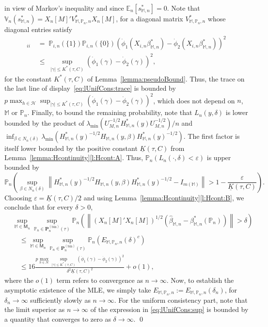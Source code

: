 \documentclass[preprint]{imsart}
\newcommand{\E}{{\mathbb E}}
\newcommand{\VC}{{\mathbb{V}}}
\renewcommand{\P}{{\mathbb P}}
\newcommand{\eps}{\varepsilon}
\newcommand{\M}{\mathbb M}
\newcommand{\lmin}{\lambda_{\min}}
\numberwithin{equation}{section}
\begin{document}
in view of Markov's inequality and since $\E_n[s_{\M,n}^*] = 0$. Note that $\VC_n(s_{\M,n}^*) = X_n[M]'V_{\M,\P_n,n}^*X_n[M]$, for a diagonal matrix $V_{\M,\P_n,n}^*$ whose diagonal entries satisfy 
\begin{align*}
[V_{\M,\P_n,n}^*]_{ii} \;&=\; \P_{i,n}(\{1\})\P_{i,n}(\{0\})(\dot{\phi}_1(X_{i,n}\beta_{\M,n}^*) - \dot{\phi}_2(X_{i,n}\beta_{\M,n}^*))^2 \\
\;&\le\; \sup_{|\gamma|\le K^*(\tau,C)}(\dot{\phi}_1(\gamma) - \dot{\phi}_2(\gamma))^2,
\end{align*}
for the constant $K^*(\tau,C)$ of Lemma~\ref{lemma:pseudoBound}.
Thus, the trace on the last line of display~\eqref{eq:lUnifCons:trace} is bounded by $p\max_{h\in\mathcal H}\sup_{|\gamma|\le K^*(\tau,C)}(\dot{\phi}_1(\gamma) - \dot{\phi}_2(\gamma))^2$, which does not depend on $n$, $\M$ or $\P_n$. Finally, to bound the remaining probability, note that $L_n(y,\delta)$ is lower bounded by the product of $\lmin(U_{M,n}^{-1/2}H_{\M,n}^*(y)U_{M,n}^{-1/2})/n$ and  $\inf_{\beta\in N_n(\delta)}  \lmin(H_{\M,n}^*(y)^{-1/2}H_{\M,n}(y,\beta)H_{\M,n}^*(y)^{-1/2})$. The first factor is itself lower bounded by the positive constant $\underline{K}(\tau, C)$ from Lemma~\ref{lemma:Hcontinuity}\ref{l:Hcont:A}. Thus, $\P_n(L_n(\cdot,\delta) < \eps )$ is upper bounded by
$$
\P_n\left( 
\sup_{\beta\in N_{n}(\delta)} \left\| H_{\M,n}^*(y)^{-1/2}H_{\M,n}(y,\beta)H_{\M,n}^*(y)^{-1/2} - I_{m(\M)} \right\| > 1- \frac{\eps}{\underline{K}(\tau, C)}
\right).
$$
Choosing $\eps = \underline{K}(\tau, C)/2$ and using Lemma~\ref{lemma:Hcontinuity}\ref{l:Hcont:B}, we conclude that for every $\delta>0$,
\begin{align}
&\sup_{\M\in\mathsf{M}_n}\sup_{\P_n\in\mathbf{P}_n^{(\mathrm{bin})}(\tau)} 
\P_n\left( 
	\left\| (X_n[M]'X_n[M])^{1/2}(\hat{\beta}_{\M,n} - \beta^*_{\M,n}(\P_n))\right\| > \delta\right)\label{eq:lUnifCons:sup}\\
&\quad\le	
\sup_{\M\in\mathsf{M}_n}\sup_{\P_n\in\mathbf{P}_n^{(\mathrm{bin})}(\tau)} 
\P_n(E_{\M,\P_n,n}(\delta)^c)\\	
&\quad\le 
16\frac{p\max_{h\in\mathcal H}\sup_{|\gamma|\le K^*(\tau,C)}(\dot{\phi}_1(\gamma) - \dot{\phi}_2(\gamma))^2}{\delta^2\underline{K}(\tau,C)^2}	
+
o(1),
\end{align}
where the $o(1)$ term refers to convergence as $n\to\infty$.
Now, to establish the asymptotic existence of the MLE, we simply take $E_{\M,\P_n,n} :=E_{\M,\P_n,n}(\delta_n)$, for $\delta_n\to\infty$ sufficiently slowly as $n\to\infty$. For the uniform consistency part, note that the limit superior as $n\to\infty$ of the expression in \eqref{eq:lUnifCons:sup} is bounded by a quantity that converges to zero as $\delta\to\infty$. \hfill{\qed}
\end{document}
